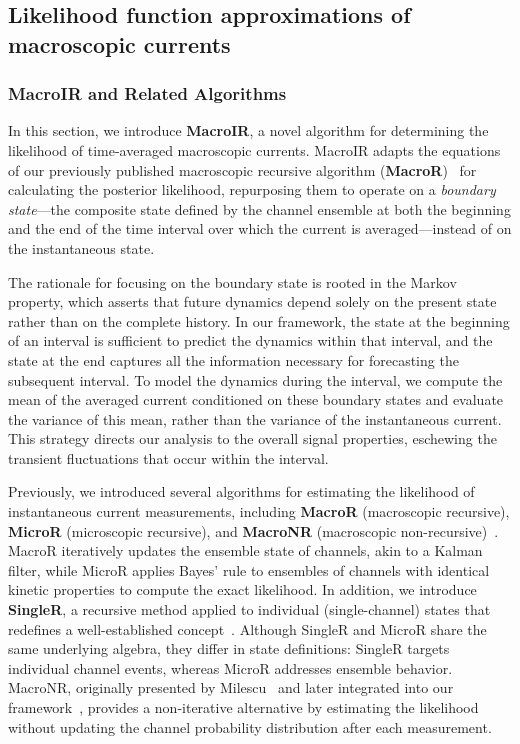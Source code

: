 \documentclass[pdflatex,sn-nature]{sn-jnl}%
\begin{document}

\subsection{Likelihood function approximations of macroscopic currents}
\subsubsection{MacroIR and Related Algorithms}
In this section, we introduce \textbf{MacroIR}, a novel algorithm for determining the likelihood of time-averaged macroscopic currents. MacroIR adapts the equations of our previously published macroscopic recursive algorithm (\textbf{MacroR})~\cite{Moffatt} for calculating the posterior likelihood, repurposing them to operate on a \emph{boundary state}---the composite state defined by the channel ensemble at both the beginning and the end of the time interval over which the current is averaged---instead of on the instantaneous state.

The rationale for focusing on the boundary state is rooted in the Markov property, which asserts that future dynamics depend solely on the present state rather than on the complete history. In our framework, the state at the beginning of an interval is sufficient to predict the dynamics within that interval, and the state at the end captures all the information necessary for forecasting the subsequent interval. To model the dynamics during the interval, we compute the mean of the averaged current conditioned on these boundary states and evaluate the variance of this mean, rather than the variance of the instantaneous current. This strategy directs our analysis to the overall signal properties, eschewing the transient fluctuations that occur within the interval.

Previously, we introduced several algorithms for estimating the likelihood of instantaneous current measurements, including \textbf{MacroR} (macroscopic recursive), \textbf{MicroR} (microscopic recursive), and \textbf{MacroNR} (macroscopic non-recursive)~\cite{Moffatt}. MacroR iteratively updates the ensemble state of channels, akin to a Kalman filter, while MicroR applies Bayes’ rule to ensembles of channels with identical kinetic properties to compute the exact likelihood. In addition, we introduce \textbf{SingleR}, a recursive method applied to individual (single-channel) states that redefines a well-established concept~\cite{Qin}. Although SingleR and MicroR share the same underlying algebra, they differ in state definitions: SingleR targets individual channel events, whereas MicroR addresses ensemble behavior. MacroNR, originally presented by Milescu~\cite{Milescu} and later integrated into our framework~\cite{Moffatt}, provides a non-iterative alternative by estimating the likelihood without updating the channel probability distribution after each measurement.
\end{document}
